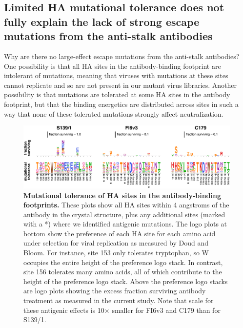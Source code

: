 \documentclass[11pt]{article}
\begin{document}
\subsection*{Limited HA mutational tolerance does not fully explain the lack of strong escape mutations from the anti-stalk antibodies}
Why are there no large-effect escape mutations from the anti-stalk antibodies?
One possibility is that all HA sites in the antibody-binding footprint are intolerant of mutations, meaning that viruses with mutations at these sites cannot replicate and so are not present in our mutant virus libraries.
Another possibility is that mutations are tolerated at some HA sites in the antibody footprint, but that the binding energetics are distributed across sites in such a way that none of these tolerated mutations strongly affect neutralization.

\begin{figure}
\centerline{\includegraphics[width=\textwidth]{figs/prefs_fracsurvive/prefs_fracsurvive_logoplots.pdf}}
\caption{
\label{fig:muttolerance}
{\bf Mutational tolerance of HA sites in the antibody-binding footprints.}
These plots show all HA sites within 4 angstroms of the antibody in the crystal structure, plus any additional sites (marked with a *) where we identified antigenic mutations. 
The logo plots at bottom show the preference of each HA site for each amino acid under selection for viral replication as measured by Doud and Bloom\cite{doud2016accurate}.
For instance, site 153 only tolerates tryptophan, so W occupies the entire height of the preference logo stack.
In contrast, site 156 tolerates many amino acids, all of which contribute to the height of the preference logo stack. 
Above the preference logo stacks are logo plots showing the excess fraction surviving antibody treatment as measured in the current study.
Note that scale for these antigenic effects is 10$\times$ smaller for FI6v3 and C179 than for S139/1.
}
\end{figure}
\end{document}
